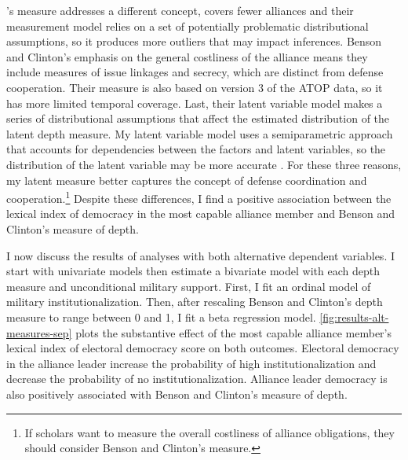 \documentclass[12pt]{article}
\begin{document}
\citet{BensonClinton2016}'s measure addresses a different concept, covers fewer alliances and their measurement model relies on a set of potentially problematic distributional assumptions, so it produces more outliers that may impact inferences.
Benson and Clinton's emphasis on the general costliness of the alliance means they include measures of issue linkages and secrecy, which are distinct from defense cooperation. 
Their measure is also based on version 3 of the ATOP data, so it has more limited temporal coverage. 
Last, their latent variable model makes a series of distributional assumptions that affect the estimated distribution of the latent depth measure. 
My latent variable model uses a semiparametric approach that accounts for dependencies between the factors and latent variables, so the distribution of the latent variable may be more accurate \citep{Murrayetal2013}.
For these three reasons, my latent measure better captures the concept of defense coordination and cooperation.\footnote{If scholars want to measure the overall costliness of alliance obligations, they should consider Benson and Clinton's measure.} 
Despite these differences, I find a positive association between the lexical index of democracy in the most capable alliance member and Benson and Clinton's measure of depth. 


I now discuss the results of analyses with both alternative dependent variables. 
I start with univariate models then estimate a bivariate model with each depth measure and unconditional military support. 
First, I fit an ordinal model of military institutionalization. 
Then, after rescaling Benson and Clinton's depth measure to range between 0 and 1, I fit a beta regression model. 
\autoref{fig:results-alt-measures-sep} plots the substantive effect of the most capable alliance member's lexical index of electoral democracy score on both outcomes. 
Electoral democracy in the alliance leader increase the probability of high institutionalization and decrease the probability of no institutionalization. 
Alliance leader democracy is also positively associated with Benson and Clinton's measure of depth. 
\end{document}
